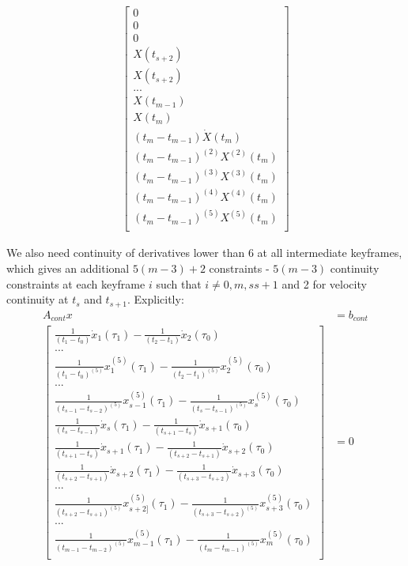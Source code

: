 \documentclass[11pt]{article}
\begin{document}
\begin{align}
\begin{bmatrix}
 0 \\
 0 \\
 0 \\
X(t_{s+2}) \\
X(t_{s+2}) \\
... \\
    X(t_{m-1}) \\
    X(t_m) \\
  (t_m-t_{m-1}) \dot{X} (t_m) \\
  (t_m-t_{m-1})^{(2)}  X^{(2)} (t_m) \\
     (t_m-t_{m-1})^{(3)}  X^{(3)} (t_m) \\
    (t_m-t_{m-1})^{(4)}  X^{(4)} (t_m) \\
   (t_m-t_{m-1})^{(5)}  X^{(5)} (t_m) \\ 
 \end{bmatrix} 
\end{align}


We also need continuity of derivatives lower than 6 at all intermediate keyframes, which gives an additional $5(m-3)+2$ constraints - $5(m-3)$ continuity constraints at each keyframe $i$ such that $i \ne 0, m, s s+1$ and 2 for velocity continuity at $t_{s}$ and $t_{s+1}$. Explicitly: 
 \begin{align*}
 A_{cont} x &= b_{cont} \\
 \begin{bmatrix}
  \frac{1}{(t_1-t_0)} \dot{x}_1 (\tau_1) - \frac{1}{(t_2-t_1)} \dot{x}_2(\tau_0) \\
  ... \\
  \frac{1}{(t_1-t_0)^{(5)}} x^{(5)}_1 (\tau_1) - \frac{1}{(t_2-t_1)^{(5)}} x^{(5)}_2 (\tau_0) \\
  ... \\
  \frac{1}{(t_{s-1}-t_{s-2})^{(5)}} x^{(5)}_{s-1} (\tau_1) - \frac{1}{(t_s-t_{s-1})^{(5)}} x^{(5)}_s (\tau_0) \\
 \frac{1}{(t_{s}-t_{s-1})} \dot{x}_{s} (\tau_1) -  \frac{1}{(t_{s+1}-t_{s})}  \dot{x}_{s+1} (\tau_0) \\
  \frac{1}{(t_{s+1}-t_{s})} \dot{x}_{s+1} (\tau_1) -  \frac{1}{(t_{s+2}-t_{s+1})}  \dot{x}_{s+2} (\tau_0) \\
  \frac{1}{(t_{s+2}-t_{s+1})} \dot{x}_{s+2} (\tau_1) - \frac{1}{(t_{s+3}-t_{s+2})} \dot{x}_{s+3}(\tau_0) \\
  ... \\
  \frac{1}{(t_{s+2}-t_{s+1})^{(5)}} x^{(5)}_{s+2]} (\tau_1) - \frac{1}{(t_{s+3}-t_{s+2})^{(5)}} x^{(5)}_{s+3} (\tau_0) \\
  ... \\
  \frac{1}{(t_{m-1}-t_{m-2})^{(5)}} x^{(5)}_{m-1} (\tau_1) - \frac{1}{(t_m-t_{m-1})^{(5)}} x^{(5)}_m (\tau_0) \\
 \end{bmatrix} 
 &= 0
 \end{align*}
 
\end{document}
